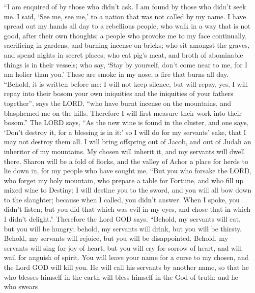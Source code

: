  ``I am enquired of by those who didn't ask. I am found by
those who didn't seek me. I said, `See me, see me,' to a nation that was
not called by my name.  I have spread out my hands all day
to a rebellious people, who walk in a way that is not good, after their
own thoughts;  a people who provoke me to my face
continually, sacrificing in gardens, and burning incense on bricks;
 who sit amongst the graves, and spend nights in secret
places; who eat pig's meat, and broth of abominable things is in their
vessels;  who say, `Stay by yourself, don't come near to
me, for I am holier than you.' These are smoke in my nose, a fire that
burns all day.  ``Behold, it is written before me: I will
not keep silence, but will repay, yes, I will repay into their bosom
 your own iniquities and the iniquities of your fathers
together'', says the LORD, ``who have burnt incense on the mountains,
and blasphemed me on the hills. Therefore I will first measure their
work into their bosom.''  The LORD says, ``As the new wine
is found in the cluster, and one says, `Don't destroy it, for a blessing
is in it:' so I will do for my servants' sake, that I may not destroy
them all.  I will bring offspring out of Jacob, and out of
Judah an inheritor of my mountains. My chosen will inherit it, and my
servants will dwell there.  Sharon will be a fold of
flocks, and the valley of Achor a place for herds to lie down in, for my
people who have sought me.  ``But you who forsake the
LORD, who forget my holy mountain, who prepare a table for Fortune, and
who fill up mixed wine to Destiny;  I will destine you to
the sword, and you will all bow down to the slaughter; because when I
called, you didn't answer. When I spoke, you didn't listen; but you did
that which was evil in my eyes, and chose that in which I didn't
delight.''  Therefore the Lord GOD says, ``Behold, my
servants will eat, but you will be hungry; behold, my servants will
drink, but you will be thirsty. Behold, my servants will rejoice, but
you will be disappointed.  Behold, my servants will sing
for joy of heart, but you will cry for sorrow of heart, and will wail
for anguish of spirit.  You will leave your name for a
curse to my chosen, and the Lord GOD will kill you. He will call his
servants by another name,  so that he who blesses himself
in the earth will bless himself in the God of truth; and he who swears
